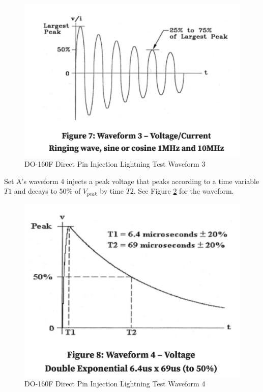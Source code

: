 \documentclass[conference]{IEEEtran}
\begin{document}
\begin{figure}[hp]
    \centering
    \includegraphics[width=1.0\linewidth]{do-160f_waveform_set_3.png}
    \caption{DO-160F Direct Pin Injection Lightning Test Waveform 3}
    \label{fig:do-160f_waveform_set_3_diagram}
\end{figure}

Set A's waveform 4 injects a peak voltage that peaks according to a time variable ${T1}$ and decays to 50\% of $V_{peak}$ by time ${T2}$. See Figure \ref{fig:do-160f_waveform_set_4_diagram} for the waveform.

\begin{figure}[hp]
    \centering
    \includegraphics[width=1.0\linewidth]{do-160f_waveform_set_4.png}
    \caption{DO-160F Direct Pin Injection Lightning Test Waveform 4}
    \label{fig:do-160f_waveform_set_4_diagram}
\end{figure}
\end{document}
